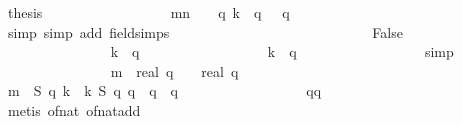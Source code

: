 \begin{isabellebody}
\ {\isacharquery}thesis\isanewline
\ \ \ \ \ \ \ \ \ \ \ \ \ \ \ \ \isamarkupfalse%
\ {\isacharbackquoteopen}{\isacharquery}mn\ {\isacharequal}\ {}\ {\isacharminus}\ {}{\isacharslash}q{\isacharbackquoteclose}\ {\isacharbackquoteopen}k\ {\isasymin}\ {\isacharbraceleft}{}{\isachardot}{\isachardot}{\isacharless}q{\isacharplus}{}{\isacharplus}{}{\isacharbraceright}{\isacharbackquoteclose}\ {\isacharbackquoteopen}{}\ {\isasymle}\ q{\isacharbackquoteclose}\isanewline
\ \ \ \ \ \ \ \ \ \ \ \ \ \ \ \ \isamarkupfalse%
\ simp\ {\isacharparenleft}simp\ add{\isacharcolon}\ field{\isacharunderscore}simps{\isacharparenright}\isanewline
\ \ \ \ \ \ \ \ \ \ \ \ \isamarkupfalse%
\isanewline
\ \ \ \ \ \ \ \ \ \ \ \ \ \ \isamarkupfalse%
\ False\isanewline
\ \ \ \ \ \ \ \ \ \ \ \ \ \ \isamarkupfalse%
\ {\isachardoublequoteopen}k\ {\isacharequal}\ q{\isacharplus}{}{\isachardoublequoteclose}\isanewline
\ \ \ \ \ \ \ \ \ \ \ \ \ \ \ \ \isamarkupfalse%
\ {\isacharbackquoteopen}k\ {\isasymin}\ {\isacharbraceleft}{}{\isachardot}{\isachardot}{\isacharless}q{\isacharplus}{}{\isacharplus}{}{\isacharbraceright}{\isacharbackquoteclose}\isanewline
\ \ \ \ \ \ \ \ \ \ \ \ \ \ \ \ \isamarkupfalse%
\ simp\isanewline
\ \ \ \ \ \ \ \ \ \ \ \ \ \ \isamarkupfalse%
\ {\isachardoublequoteopen}m{\isacharprime}\ {\isacharequal}\ {\isacharparenleft}real\ q\ {\isacharminus}\ {}{\isacharparenright}\ {\isacharslash}\ real\ q{\isachardoublequoteclose}\isanewline
\ \ \ \ \ \ \ \ \ \ \ \ \ \ \ \ \isamarkupfalse%
\ {\isacharbackquoteopen}m{\isacharprime}\ {\isacharequal}\ {\isacharquery}S\ {\isacharparenleft}q{\isacharplus}{}{\isacharparenright}\ k\ {\isacharslash}\ k{\isacharbackquoteclose}\ {\isacharbackquoteopen}{\isacharquery}S\ {\isacharparenleft}q{\isacharplus}{}{\isacharparenright}\ {\isacharparenleft}q{\isacharplus}{}{\isacharparenright}\ {\isacharequal}\ q\ {\isacharminus}\ {}{\isacharslash}q{\isacharbackquoteclose}\isanewline
\ \ \ \ \ \ \ \ \ \ \ \ \ \ \ \ \isamarkupfalse%
\ qq\isanewline
\ \ \ \ \ \ \ \ \ \ \ \ \ \ \ \ \isamarkupfalse%
\ {\isacharparenleft}metis\ of{\isacharunderscore}nat{\isacharunderscore}{}\ of{\isacharunderscore}nat{\isacharunderscore}add{\isacharparenright}\isanewline
\ \ \ \ \ \ \ \ \ \ \ \ \ \ \isamarkupfalse%

\end{isabellebody}

